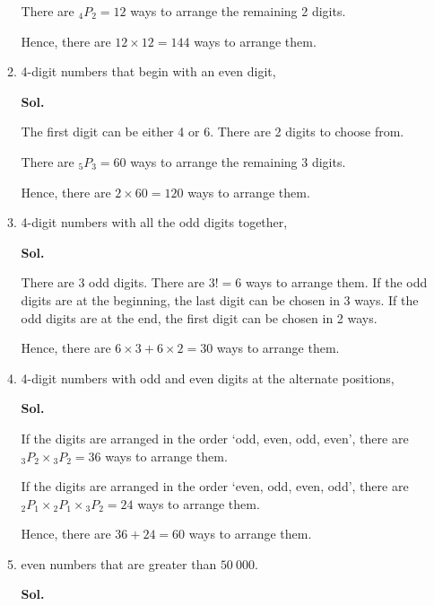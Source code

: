 \documentclass{report}
\newcommand\permtwo[2][^n]{{}_{#1}P_{#2}}
\newcommand{\sol}[1]{

      \noindent \textbf{Sol.}
}
\def\eos{\quad\hbox{\rlap{\hbox{\vrule depth 1.5pt height 2.6mm width 0.2mm \hskip 1mm \vrule height 2.6mm width 0.2mm}}{\vbox{\hrule height 0.2mm width 1.4mm \vskip 2.8mm \hrule depth 1.5pt height -0.35mm width 1.2mm}}}}
\begin{document}
\begin{multicols*}{2}
\begin{enumerate}
\begin{enumerate}
                              There are $\permtwo[4]{2} = 12$ ways to arrange the remaining 2 digits.

                              Hence, there are $12 \times 12 = 144$ ways to arrange them. $\eos$

                        \item 4-digit numbers that begin with an even digit,
                              \sol{}

                              The first digit can be either 4 or 6. There are 2 digits to choose from.

                              There are $\permtwo[5]{3} = 60$ ways to arrange the remaining 3 digits.

                              Hence, there are $2 \times 60 = 120$ ways to arrange them. $\eos$

                        \item 4-digit numbers with all the odd digits together,
                              \sol{}

                              There are 3 odd digits. There are $3! = 6$ ways to arrange them. If the odd
                              digits are at the beginning, the last digit can be chosen in 3 ways. If the odd
                              digits are at the end, the first digit can be chosen in 2 ways.

                              Hence, there are $6 \times 3 + 6 \times 2 = 30$ ways to arrange them. $\eos$

                        \item 4-digit numbers with odd and even digits at the alternate positions,
                              \sol{}

                              If the digits are arranged in the order `odd, even, odd, even', there are
                              $\permtwo[3]{2} \times \permtwo[3]{2} = 36$ ways to arrange them.

                              If the digits are arranged in the order `even, odd, even, odd', there are
                              $\permtwo[2]{1} \times \permtwo[2]{1} \times \permtwo[3]{2} = 24$ ways to
                              arrange them.

                              Hence, there are $36 + 24 = 60$ ways to arrange them. $\eos$

                        \item even numbers that are greater than $50\ 000$. \sol{}


\end{enumerate}
\end{enumerate}
\end{multicols*}
\end{document}
